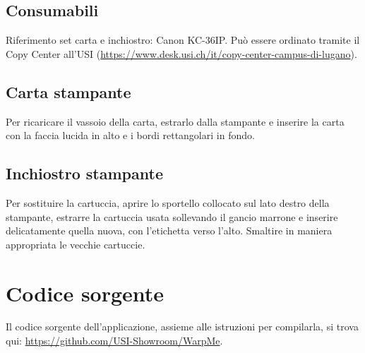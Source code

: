 \documentclass[12pt]{article}
\begin{document}
	\subsection{Consumabili}
	
		Riferimento set carta e inchiostro: Canon KC-36IP. Può essere ordinato tramite il Copy Center all'USI (\url{https://www.desk.usi.ch/it/copy-center-campus-di-lugano}).
		

	\subsection{Carta stampante}		
		
		Per ricaricare il vassoio della carta, estrarlo dalla stampante e inserire la carta con la faccia lucida in alto e i bordi rettangolari in fondo.
		
		
	\subsection{Inchiostro stampante}
		
		Per sostituire la cartuccia, aprire lo sportello collocato sul lato destro della stampante, estrarre la cartuccia usata sollevando il gancio marrone e inserire delicatamente quella nuova, con l'etichetta verso l'alto. Smaltire in maniera appropriata le vecchie cartuccie.
		
		
		
\section{Codice sorgente}

	Il codice sorgente dell'applicazione, assieme alle istruzioni per compilarla, si trova qui: \url{https://github.com/USI-Showroom/WarpMe}.
		
	
\end{document}
